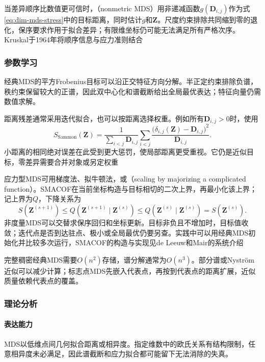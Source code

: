 当差异顺序比数值更可信时，（nonmetric MDS）用非递减函数$g(\bm{D}_{i,j})$作为式\eqref{eq:dim-mds-stress}中的目标距离，同时估计$g$和$\bm{Z}$。尺度约束排除共同缩到零的退化，保序要求作用于拟合差异；有限维坐标仍可能无法满足所有严格次序。Kruskal于1964年将顺序信息与应力准则结合

\subsubsection{参数学习}

经典MDS的平方Frobenius目标可以沿正交特征方向分解。半正定约束排除负谱，秩约束保留较大的正谱，因此双中心化和谱截断给出全局最优表达；特征向量仍需数值求解。

距离残差通常采用迭代拟合，也可以按距离选择权重。例如所有$\bm{D}_{i,j}>0$时，使用
\begin{equation}
  \label{eq:dim-sammon}
  S_{\mathrm{Sammon}}(\bm{Z})
  =\frac{1}{\sum_{i<j}\bm{D}_{i,j}}
    \sum_{i<j}
    \frac{\bigl(\delta_{i,j}(\bm{Z})-\bm{D}_{i,j}\bigr)^2}
         {\bm{D}_{i,j}}.
\end{equation}
小距离的相同绝对误差在此受到更大惩罚，使局部距离更受重视。它仍是近似目标，零差异需要合并对象或另定权重

应力型MDS可用梯度法、拟牛顿法，或（scaling by majorizing a complicated function）。SMACOF在当前坐标构造与目标相切的二次上界，再最小化该上界；记上界为$Q$，下降关系为
\[
  S(\bm{Z}^{(s+1)})
  \leq Q(\bm{Z}^{(s+1)}\mid\bm{Z}^{(s)})
  \leq Q(\bm{Z}^{(s)}\mid\bm{Z}^{(s)})
  =S(\bm{Z}^{(s)}).
\]
非度量MDS可以交替求保序回归和坐标更新。目标非负且不增加时，目标值收敛；迭代点是否到达驻点、极小或全局最优仍要另查。实践中可以用经典MDS初始化并比较多次运行，SMACOF的构造与实现见de Leeuw和Mair的系统介绍

完整稠密经典MDS需要$O(n^2)$存储，谱分解通常为$O(n^3)$。部分谱或Nystr\"om近似可以减少计算；标志点MDS先嵌入代表点，再按到代表点的距离扩展，近似质量依赖代表点的覆盖。

\subsubsection{理论分析}
\label{sec:dim-mds-theory}

\paragraph{表达能力}
MDS以低维点间几何拟合距离或相异度。指定维数中的欧氏关系有结构限制，任意相异度未必满足，因此谱截断和应力拟合都可能留下无法消除的失真。

